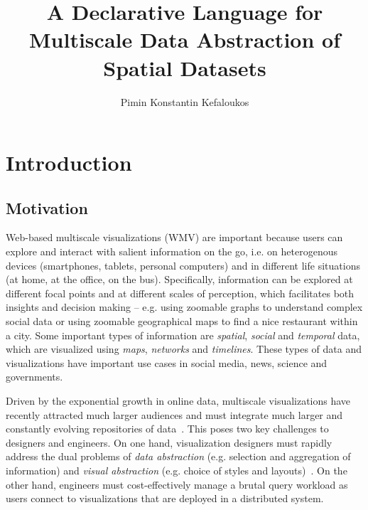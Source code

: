 \documentclass[11pt, oneside]{report}   	%
\title{A Declarative Language for Multiscale Data Abstraction of Spatial Datasets}
\author{Pimin Konstantin Kefaloukos}
\begin{document}
\maketitle

\tableofcontents

\chapter{Introduction}

\section{Motivation}
Web-based multiscale visualizations (WMV) are important because users can explore and interact with salient information on the go, i.e. on heterogenous devices (smartphones, tablets, personal computers) and in different life situations (at home, at the office, on the bus).  Specifically, information can be explored at different focal points and at different scales of perception, which facilitates both insights and decision making -- e.g. using zoomable graphs to understand complex social data or using zoomable geographical maps to find a nice restaurant within a city. Some important types of information are \emph{spatial}, \emph{social} and \emph{temporal} data, which are visualized using \emph{maps}, \emph{networks} and \emph{timelines}. These types of data and visualizations have important use cases in social media, news, science and governments.

Driven by the exponential growth in online data, multiscale visualizations have recently attracted much larger audiences and must integrate much larger and constantly evolving repositories of data~\cite{gst, foo}. This poses two key challenges to designers and engineers. On one hand, visualization designers must rapidly address the dual problems of \emph{data abstraction} (e.g. selection and aggregation of information) and \emph{visual abstraction} (e.g. choice of styles and layouts)~\cite{stolte2003multiscale}. On the other hand, engineers must cost-effectively manage a brutal query workload as users connect to visualizations that are deployed in a distributed system.


\end{document}
